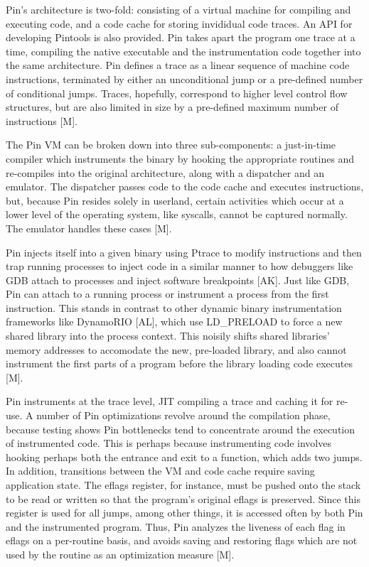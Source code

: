 \documentclass[11pt,expanded,copyright]{fsuthesis}
\begin{document}
Pin's architecture is two-fold: consisting of a virtual machine for compiling and executing code, and a code cache for storing invididual code traces. An API for developing Pintools is also provided. Pin takes apart the program one trace at a time, compiling the native executable and the instrumentation code together into the same architecture. Pin defines a trace as a linear sequence of machine code instructions, terminated by either an unconditional jump or a pre-defined number of conditional jumps. Traces, hopefully, correspond to higher level control flow structures, but are also limited in size by a pre-defined maximum number of instructions [M].

The Pin VM can be broken down into three sub-components: a just-in-time compiler which instruments the binary by hooking the appropriate routines and re-compiles into the original architecture, along with a dispatcher and an emulator. The dispatcher passes code to the code cache and executes instructions, but, because Pin resides solely in userland, certain activities which occur at a lower level of the operating system, like syscalls, cannot be captured normally. The emulator handles these cases [M].

Pin injects itself into a given binary using Ptrace to modify instructions and then trap running processes to inject code in a similar manner to how debuggers like GDB attach to processes and inject software breakpoints [AK]. Just like GDB, Pin can attach to a running process or instrument a process from the first instruction. This stands in contrast to other dynamic binary instrumentation frameworks like DynamoRIO [AL], which use LD\_PRELOAD to force a new  shared library into the process context. This noisily shifts shared libraries' memory addresses to accomodate the new, pre-loaded library, and also cannot instrument the first parts of a program before the library loading code executes [M].

Pin instruments at the trace level, JIT compiling a trace and caching it for re-use. A number of Pin optimizations revolve around the compilation phase, because testing shows Pin bottlenecks tend to concentrate around the execution of instrumented code. This is perhaps because instrumenting code involves hooking perhaps both the entrance and exit to a function, which adds two jumps. In addition, transitions between the VM and code cache require saving application state. The eflags register, for instance, must be pushed onto the stack to be read or written so that the program's original eflags is preserved. Since this register is used for all jumps, among other things, it is accessed often by both Pin and the instrumented program. Thus, Pin analyzes the liveness of each flag in eflags on a per-routine basis, and avoids saving and restoring flags which are not used by the routine as an optimization measure [M].
\end{document}
